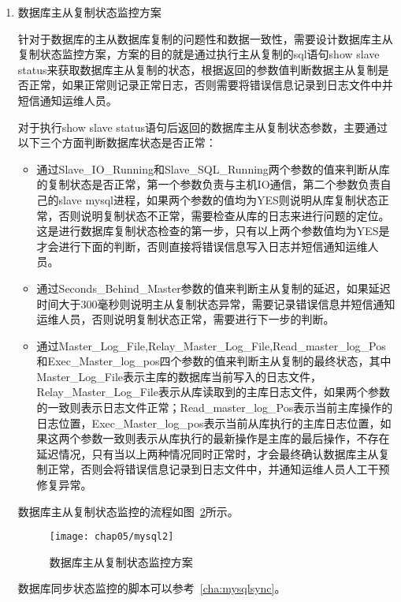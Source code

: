 \begin{enumerate}
综上所述，数据健康健康脚本的执行流程和顺序如图~\ref{fig:mysql-healty-monitor}所示。
\begin{figure}[H] %
  \centering
  \texttt{[image: chap05/mysql1]}
  \caption{数据库健康状态监控方案}
  \label{fig:mysql-healty-monitor}
\end{figure}
完整的数据库健康监控脚本可以参考附录~\ref{cha:mysqlhealth}。

\item 数据库主从复制状态监控方案

针对于数据库的主从数据库复制的问题性和数据一致性，需要设计数据库主从复制状态监控方案，方案的目的就是通过执行主从复制的sql语句show slave status来获取数据库主从复制的状态，根据返回的参数值判断数据主从复制是否正常，如果正常则记录正常日志，否则需要将错误信息记录到日志文件中并短信通知运维人员。

对于执行show slave status语句后返回的数据库主从复制状态参数，主要通过以下三个方面判断数据库状态是否正常：
\begin{itemize}
  \item 通过Slave\_IO\_Running和Slave\_SQL\_Running两个参数的值来判断从库的复制状态是否正常，第一个参数负责与主机IO通信，第二个参数负责自己的slave mysql进程，如果两个参数的值均为YES则说明从库复制状态正常，否则说明复制状态不正常，需要检查从库的日志来进行问题的定位。这是进行数据库复制状态检查的第一步，只有以上两个参数值均为YES是才会进行下面的判断，否则直接将错误信息写入日志并短信通知运维人员。
  \item 通过Seconds\_Behind\_Master参数的值来判断主从复制的延迟，如果延迟时间大于300毫秒则说明主从复制状态异常，需要记录错误信息并短信通知运维人员，否则说明复制状态正常，需要进行下一步的判断。
  \item 通过Master\_Log\_File,Relay\_Master\_Log\_File,Read\_master\_log\_Pos和Exec\_Master\_log\_pos四个参数的值来判断主从复制的最终状态，其中Master\_Log\_File表示主库的数据库当前写入的日志文件，Relay\_Master\_Log\_File表示从库读取到的主库日志文件，如果两个参数的一致则表示日志文件正常；Read\_master\_log\_Pos表示当前主库操作的日志位置，Exec\_Master\_log\_pos表示当前从库执行的主库日志位置，如果这两个参数一致则表示从库执行的最新操作是主库的最后操作，不存在延迟情况，只有当以上两种情况同时正常时，才会最终确认数据库主从复制正常，否则会将错误信息记录到日志文件中，并通知运维人员人工干预修复异常。
\end{itemize}

数据库主从复制状态监控的流程如图~\ref{fig:mysql-sync-monitor}所示。
\begin{figure}[H] %
  \centering
  \texttt{[image: chap05/mysql2]}
  \caption{数据库主从复制状态监控方案}
  \label{fig:mysql-sync-monitor}
\end{figure}
数据库同步状态监控的脚本可以参考~\ref{cha:mysqlsync}。
\end{enumerate}

